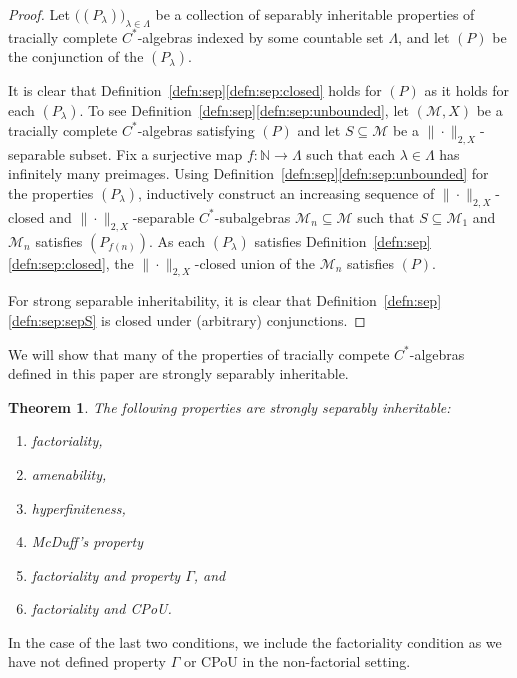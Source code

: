 \documentclass[a4paper,11pt]{amsart}
\newtheorem{theorem}{Theorem}
\theoremstyle{definition}
\numberwithin{equation}{section}
\numberwithin{theorem}{section}
\newcommand{\M}{\mathcal{M}}
\begin{document}
\begin{proof}
	Let $\big((P_\lambda)\big)_{\lambda \in \Lambda}$ be a collection of separably inheritable properties of tracially complete $C^*$-algebras indexed by some countable set $\Lambda$, and let $(P)$ be the conjunction of the $(P_\lambda)$.  
	
	It is clear that Definition~\ref{defn:sep}\ref{defn:sep:closed} holds for $(P)$ as it holds for each $(P_\lambda)$.  To see Definition~\ref{defn:sep}\ref{defn:sep:unbounded}, let $(\M, X)$ be a tracially complete $C^*$-algebras satisfying $(P)$ and let $S \subseteq \M$ be a $\|\cdot\|_{2, X}$-separable subset.  Fix a surjective map $f \colon \mathbb N \rightarrow \Lambda$ such that each $\lambda\in\Lambda$ has infinitely many preimages.  Using Definition~\ref{defn:sep}\ref{defn:sep:unbounded} for the properties $(P_\lambda)$, inductively construct an increasing sequence of $\|\cdot\|_{2, X}$-closed and $\|\cdot\|_{2,X}$-separable $C^*$-subalgebras $\M_n \subseteq \M$ such that $S \subseteq \M_1$ and $\M_n$ satisfies $(P_{f(n)})$.  As each $(P_\lambda)$ satisfies Definition~\ref{defn:sep}\ref{defn:sep:closed}, the $\|\cdot\|_{2, X}$-closed union of the $\M_n$ satisfies $(P)$.

    For strong separable inheritability, it is clear that Definition~\ref{defn:sep}\ref{defn:sep:sepS} is closed under (arbitrary) conjunctions.
\end{proof}

We will show that many of the properties of tracially compete $C^*$-algebras defined in this paper are strongly separably inheritable.

\begin{theorem}\label{thm:sep}
	The following properties are strongly separably inheritable:
	\begin{enumerate}
		\item\label{thm:sep-factorial} factoriality,
		\item\label{thm:sep-semidiscrete} {}amenability,
		\item\label{thm:sep-hyp-fin} hyperfiniteness,
		\item\label{thm:sep-McDuff} McDuff's property
		\item\label{thm:sep-Gamma} factoriality and property $\Gamma$, and
		\item \label{thm:sep-CPoU} factoriality and CPoU.
	\end{enumerate}
\end{theorem}

In the case of the last two conditions, we include the factoriality condition as we have not defined property $\Gamma$ or CPoU in the non-factorial setting.
\end{document}
